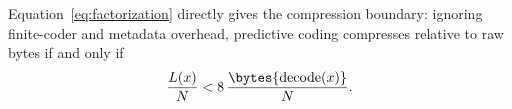 
Equation~\ref{eq:factorization} directly gives the compression boundary:
ignoring finite-coder and metadata overhead, predictive coding compresses
relative to raw bytes if and only if
\begin{equation}
    \frac{L(x)}{N}
    <
    8\,\frac{\bytes{\operatorname{decode}(x)}}{N}.
    \label{eq:compression-boundary}
\end{equation}
